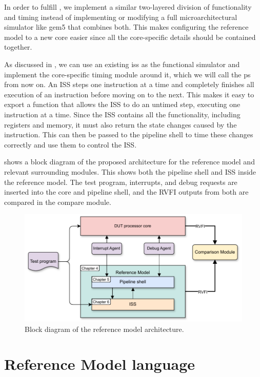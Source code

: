 In order to fulfill , we implement a similar two-layered division of functionality and timing instead of implementing or modifying a full microarchitectural simulator like gem5 \cite{Gem5Simulator2023} that combines both. This makes configuring the reference model to a new core easier since all the core-specific details should be contained together. 

As discussed in , we can use an existing \acrshort{iss} as the functional simulator and implement the core-specific timing module around it, which we will call the \gls{ps} from now on. An ISS steps one instruction at a time and completely finishes all execution of an instruction before moving on to the next. This makes it easy to export a  function that allows the ISS to do an untimed step, executing one instruction at a time. Since the ISS contains all the functionality, including registers and memory, it must also return the state changes caused by the instruction. This can then be passed to the pipeline shell to time these changes correctly and use them to control the ISS.


 shows a block diagram of the proposed architecture for the reference model and relevant surrounding modules. This shows both the pipeline shell and ISS inside the reference model. The test program, interrupts, and debug requests are inserted into the core and pipeline shell, and the RVFI outputs from both are compared in the compare module.

\begin{figure}
    \centering
    \includegraphics[width=0.75\linewidth]{figures/Architecture.pdf}
    \caption{Block diagram of the reference model architecture.}
    \label{fig:architecture}
\end{figure}


\section{Reference Model language}

